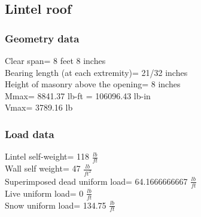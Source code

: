 \subsection{Lintel roof}
\subsubsection{Geometry data}
Clear span=  8 feet 8 inches \\
Bearing length (at each extremity)=  21/32 inches \\
Height of masonry above the opening=  8 inches \\
Mmax=  8841.37 lb-ft = 106096.43  lb-in \\
Vmax=  3789.16 lb \\
\subsubsection{Load data}
Lintel self-weight=  118  $\frac{lb}{ft}$ \\
Wall self weight=  47 $\frac{lb}{ft^2}$\\
Superimposed dead uniform load=  64.1666666667 $\frac{lb}{ft}$ \\
Live uniform load=  0 $\frac{lb}{ft}$ \\
Snow uniform load=  134.75 $\frac{lb}{ft}$ \\

